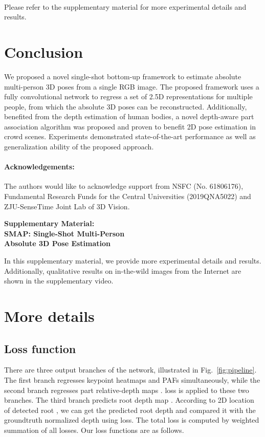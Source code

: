 \documentclass[runningheads]{llncs}
\begin{document}
~\\
Please refer to the supplementary material for more experimental details and results.

 
\section{Conclusion}

We proposed a novel single-shot bottom-up framework to estimate absolute multi-person 3D poses from a single RGB image. The proposed framework uses a fully convolutional network to regress a set of 2.5D representations for multiple people, from which the absolute 3D poses can be reconstructed. Additionally, benefited from the depth estimation of human bodies, a novel depth-aware part association algorithm was proposed and proven to benefit 2D pose estimation in crowd scenes. Experiments demonstrated state-of-the-art performance as well as generalization ability of the proposed approach.

\paragraph{\bf Acknowledgements:} The authors would like to acknowledge support from NSFC (No. 61806176), Fundamental Research Funds for the Central Universities (2019QNA5022) and ZJU-SenseTime Joint Lab of 3D Vision.
 

\clearpage
\begin{center}
    \textbf{\Large Supplementary Material: \\SMAP: Single-Shot Multi-Person \\Absolute 3D Pose Estimation} 
\end{center}
\setcounter{section}{0}

In this supplementary material, we provide more experimental details and results. Additionally, qualitative results on in-the-wild images from the Internet are shown in the supplementary video.

\section{More details}
\subsection{Loss function}
There are three output branches of the network, illustrated in  Fig.~\ref{fig:pipeline}. The first branch regresses keypoint heatmaps  and PAFs  simultaneously, while the second branch regresses part relative-depth maps .  loss is applied to these two branches. The third branch predicts root depth map . According to 2D location of detected root , we can get the predicted root depth  and compared it with the groundtruth normalized depth  using  loss. The total loss is computed by weighted summation of all losses.
Our loss functions are as follows. 
\end{document}

